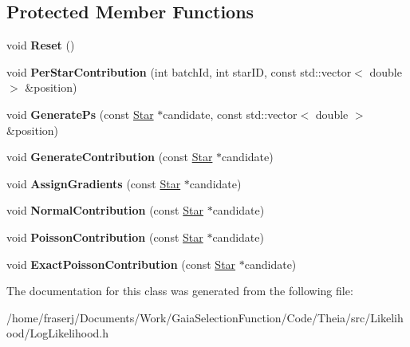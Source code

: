 \subsection*{Protected Member Functions}
\begin{DoxyCompactItemize}
\item 
\mbox{\label{classLogLikelihood_a323459623fea6256267c9724ceea8ec9}} 
void {\bfseries Reset} ()
\item 
\mbox{\label{classLogLikelihood_a85c0af6993edd46373165089a11b4fb7}} 
void {\bfseries Per\+Star\+Contribution} (int batch\+Id, int star\+ID, const std\+::vector$<$ double $>$ \&position)
\item 
\mbox{\label{classLogLikelihood_aec7a3964705a6a48a1d18011e330d585}} 
void {\bfseries Generate\+Ps} (const \hyperlink{classStar}{Star} $\ast$candidate, const std\+::vector$<$ double $>$ \&position)
\item 
\mbox{\label{classLogLikelihood_ae0db177a301dbcb1ceb13575585dc2b2}} 
void {\bfseries Generate\+Contribution} (const \hyperlink{classStar}{Star} $\ast$candidate)
\item 
\mbox{\label{classLogLikelihood_a525d4693f7231cb70405af68d2c2c6e9}} 
void {\bfseries Assign\+Gradients} (const \hyperlink{classStar}{Star} $\ast$candidate)
\item 
\mbox{\label{classLogLikelihood_a45c146d322f6a78b760383b624df66c8}} 
void {\bfseries Normal\+Contribution} (const \hyperlink{classStar}{Star} $\ast$candidate)
\item 
\mbox{\label{classLogLikelihood_a48e99798d1bad7dc63fdf2019acc1c7b}} 
void {\bfseries Poisson\+Contribution} (const \hyperlink{classStar}{Star} $\ast$candidate)
\item 
\mbox{\label{classLogLikelihood_ac848d93699c16868bf4da1884fe5c45a}} 
void {\bfseries Exact\+Poisson\+Contribution} (const \hyperlink{classStar}{Star} $\ast$candidate)
\end{DoxyCompactItemize}


The documentation for this class was generated from the following file\+:\begin{DoxyCompactItemize}
\item 
/home/fraserj/\+Documents/\+Work/\+Gaia\+Selection\+Function/\+Code/\+Theia/src/\+Likelihood/Log\+Likelihood.\+h\end{DoxyCompactItemize}
